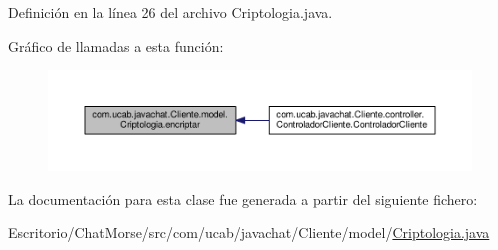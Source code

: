 Definición en la línea 26 del archivo Criptologia.\-java.



Gráfico de llamadas a esta función\-:\nopagebreak
\begin{figure}[H]
\begin{center}
\leavevmode
\includegraphics[width=350pt]{classcom_1_1ucab_1_1javachat_1_1_cliente_1_1model_1_1_criptologia_ae1dd0633e8f03d5a9ca3738ea7073275_icgraph}
\end{center}
\end{figure}




La documentación para esta clase fue generada a partir del siguiente fichero\-:\begin{DoxyCompactItemize}
\item 
Escritorio/\-Chat\-Morse/src/com/ucab/javachat/\-Cliente/model/\hyperlink{_cliente_2model_2_criptologia_8java}{Criptologia.\-java}\end{DoxyCompactItemize}
